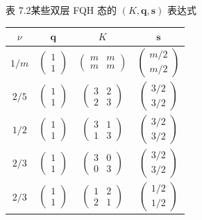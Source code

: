 \begin{center}
\small 表 7.2\quad 某些双层 FQH 态的 $(K,\boldsymbol{q},\boldsymbol{s})$ 表达式\\[6pt]
\begin{tabular}{cccc}
\toprule
$\nu$ & $\boldsymbol{q}$ & $K$ & $\boldsymbol{s}$ \\
\midrule
$1/m$ & $\begin{pmatrix}1\\1\end{pmatrix}$ &
$\begin{pmatrix}m & m\\ m & m\end{pmatrix}$ &
$\begin{pmatrix}m/2\\ m/2\end{pmatrix}$ \\[18pt]
$2/5$ & $\begin{pmatrix}1\\1\end{pmatrix}$ &
$\begin{pmatrix}3 & 2\\ 2 & 3\end{pmatrix}$ &
$\begin{pmatrix}3/2\\ 3/2\end{pmatrix}$ \\[18pt]
$1/2$ & $\begin{pmatrix}1\\1\end{pmatrix}$ &
$\begin{pmatrix}3 & 1\\ 1 & 3\end{pmatrix}$ &
$\begin{pmatrix}3/2\\ 3/2\end{pmatrix}$ \\[18pt]
$2/3$ & $\begin{pmatrix}1\\1\end{pmatrix}$ &
$\begin{pmatrix}3 & 0\\ 0 & 3\end{pmatrix}$ &
$\begin{pmatrix}3/2\\ 3/2\end{pmatrix}$ \\[18pt]
$2/3$ & $\begin{pmatrix}1\\1\end{pmatrix}$ &
$\begin{pmatrix}1 & 2\\ 2 & 1\end{pmatrix}$ &
$\begin{pmatrix}1/2\\ 1/2\end{pmatrix}$ \\
\bottomrule
\end{tabular}
\end{center}


